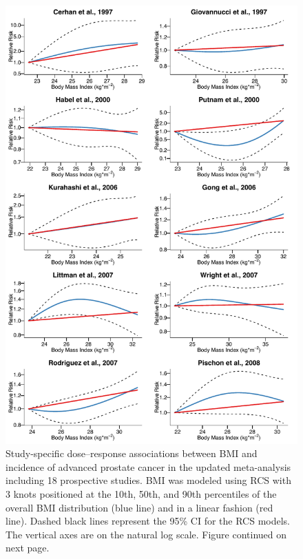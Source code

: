 \begin{figure}[p]
\centering
\includegraphics[width=\linewidth]{figures/ss_adv1.pdf}
\caption[Study-specific dose--response associations between BMI and incidence of advanced prostate cancer]{Study-specific dose--response associations between BMI and incidence of advanced prostate cancer in the updated meta-analysis including 18 prospective studies. BMI was modeled using RCS with 3 knots positioned at the 10th, 50th, and 90th percentiles of the overall BMI distribution (blue line) and in a linear fashion (red line). Dashed black lines represent the 95\% CI for the RCS models. The vertical axes are on the natural log scale. Figure continued on next page.}
\label{fig:ss_adv}
\end{figure}


